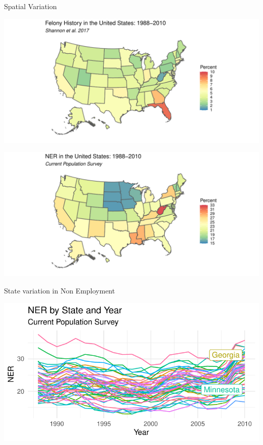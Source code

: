 \documentclass{beamer}
\begin{document}
\begin{frame}{Spatial Variation}




\begin{knitrout}
\color{fgcolor}
\includegraphics[width=\maxwidth]{figure/unnamed-chunk-5-1} 

\includegraphics[width=\maxwidth]{figure/unnamed-chunk-5-2} 

\end{knitrout}

\end{frame}

\begin{frame}{State variation in Non Employment}
\begin{knitrout}
\color{fgcolor}
\includegraphics[width=\maxwidth]{figure/unnamed-chunk-6-1} 

\end{knitrout}
\end{frame}
\end{document}
